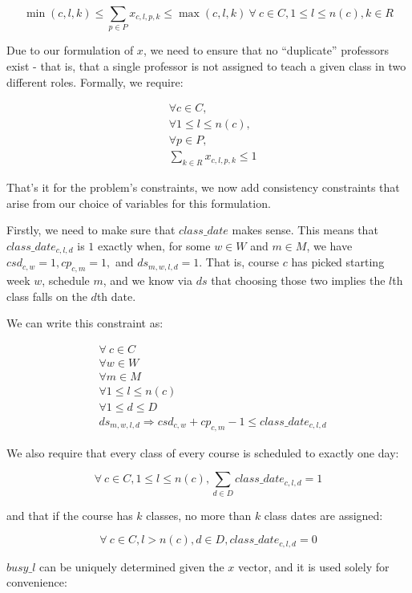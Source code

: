 $$
\min(c, l, k) \le \sum_{p \in P} x_{c, l, p, k} \le \max(c, l, k)\ \forall\ c \in C, 1 \le l \le n(c), k \in R
$$

Due to our formulation of $x$, we need to ensure that no ``duplicate'' professors exist - that is, that a single professor is not assigned to teach a given class in two different roles. Formally, we require:

\begin{align*}
  &\forall c \in C,\\
  &\forall 1 \le l \le n(c),\\
  &\forall p \in P,\\
  &\sum_{k \in R} x_{c, l, p, k} \le 1
\end{align*}


That's it for the problem's constraints, we now add consistency constraints that arise from our choice of variables for this formulation.

Firstly, we need to make sure that $class\_date$ makes sense. This means that $class\_date_{c, l, d}$ is $1$ exactly when, for some $w \in W$ and $m \in M$, we have $csd_{c, w} = 1, cp_{c, m} = 1,$ and $ds_{m, w, l, d} = 1$. That is, course $c$ has picked starting week $w$, schedule $m$, and we know via $ds$ that choosing those two implies the $l$th class falls on the $d$th date.

We can write this constraint as:

\begin{align*}
  &\forall\ c \in C\\
  &\forall w \in W\\
  &\forall m \in M\\
  &\forall 1 \le l \le n(c)\\
  &\forall 1 \le d \le D\\
  &ds_{m, w, l, d} \Rightarrow csd_{c, w} + cp_{c, m} - 1 \le class\_date_{c, l, d}
\end{align*}

We also require that every class of every course is scheduled to exactly one day:

$$
\forall\ c \in C, 1 \le l \le n(c), \sum_{d \in D} class\_date_{c, l, d} = 1
$$

and that if the course has $k$ classes, no more than $k$ class dates are assigned:

$$
\forall\ c \in C, l > n(c), d \in D, class\_date_{c, l, d} = 0
$$

$busy\_l$ can be uniquely determined given the $x$ vector, and it is used solely for convenience:


